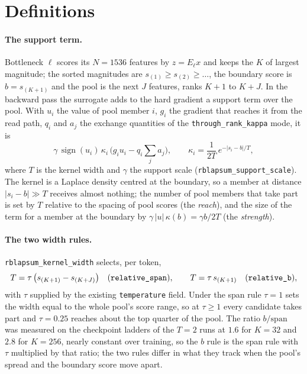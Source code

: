 \documentclass[11pt,a4paper]{article}
\newcommand{\code}[1]{\texttt{#1}}
\newcommand{\sgn}{\operatorname{sign}}
\begin{document}
\section{Definitions}

\paragraph{The support term.}
Bottleneck $\ell$ scores its $N = 1536$ features by $z = E_\ell x$ and keeps
the $K$ of largest magnitude; the sorted magnitudes are $s_{(1)} \ge s_{(2)}
\ge \dots$, the boundary score is $b = s_{(K+1)}$ and the pool is the next $J$
features, ranks $K+1$ to $K+J$. In the backward pass the surrogate adds to the
hard gradient a support term over the pool. With $u_i$ the value of pool
member $i$, $g_i$ the gradient that reaches it from the read path, $q_i$ and
$a_j$ the exchange quantities of the \code{through\_rank\_kappa} mode, it is
\begin{equation}
\gamma\,\sgn(u_i)\,\kappa_i\,\bigl(g_i u_i - q_i\textstyle\sum_j a_j\bigr),
\qquad
\kappa_i=\frac{1}{2T}\,e^{-|s_i-b|/T},
\label{eq:support}
\end{equation}
where $T$ is the kernel width and $\gamma$ the support scale
(\code{rblapsum\_support\_scale}). The kernel is a Laplace density centred at
the boundary, so a member at distance $|s_i - b| \gg T$ receives almost
nothing; the number of pool members that take part is set by $T$ relative to
the spacing of pool scores (the \emph{reach}), and the size of the term for a
member at the boundary by $\gamma\,|u|\,\kappa(b) = \gamma b / 2T$ (the
\emph{strength}).

\paragraph{The two width rules.}
\code{rblapsum\_kernel\_width} selects, per token,
\begin{equation}
T = \tau\,\bigl(s_{(K+1)} - s_{(K+J)}\bigr)
\quad\text{(\code{relative\_span})},
\qquad
T = \tau\, s_{(K+1)}
\quad\text{(\code{relative\_b})},
\label{eq:width}
\end{equation}
with $\tau$ supplied by the existing \code{temperature} field. Under the span
rule $\tau = 1$ sets the width equal to the whole pool's score range, so at
$\tau \ge 1$ every candidate takes part and $\tau = 0.25$ reaches about the
top quarter of the pool. The ratio $b/\mathrm{span}$ was measured on the
checkpoint ladders of the $T = 2$ runs at $1.6$ for $K = 32$ and $2.8$ for
$K = 256$, nearly constant over training, so the $b$ rule is the span rule
with $\tau$ multiplied by that ratio; the two rules differ in what they track
when the pool's spread and the boundary score move apart.
\end{document}
